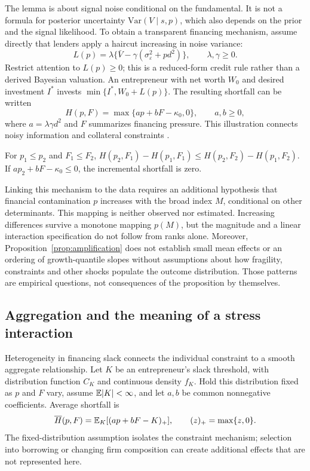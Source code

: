 The lemma is about signal noise conditional on the fundamental. It is not a
formula for posterior uncertainty $\mathrm{Var}(V\mid s,p)$, which also
depends on the prior and the signal likelihood. To obtain a transparent
financing mechanism, assume directly that lenders apply a haircut increasing
in noise variance:
\begin{equation}\label{eq:credit}
 L(p)=\lambda\{\bar V-\gamma(\sigma_\varepsilon^2+pd^2)\},
 \qquad \lambda,\gamma\ge0.
\end{equation}
Restrict attention to $L(p)\ge0$; this is a reduced-form credit rule rather
than a derived Bayesian valuation. An entrepreneur with net worth $W_0$ and
desired investment $I^*$ invests $\min\{I^*,W_0+L(p)\}$. The resulting
shortfall can be written
\begin{equation}\label{eq:harm}
 H(p,F)=\max\{ap+bF-\kappa_0,0\},\qquad a,b\ge0,
\end{equation}
where $a=\lambda\gamma d^2$ and $F$ summarizes financing pressure. This
illustration connects noisy information and collateral constraints
\citep{kiyotaki1997credit,bernanke1999financial,bond2012real}.

\begin{proposition}\label{prop:amplification}
For $p_1\le p_2$ and $F_1\le F_2$,
$H(p_2,F_1)-H(p_1,F_1)\le H(p_2,F_2)-H(p_1,F_2)$.
If $ap_2+bF-\kappa_0\le0$, the incremental shortfall is zero.
\end{proposition}

Linking this mechanism to the data requires an additional hypothesis that
financial contamination $p$ increases with the broad index $M$, conditional
on other determinants. This mapping is neither observed nor estimated.
Increasing differences survive a monotone mapping $p(M)$, but the magnitude
and a linear interaction specification do not follow from ranks alone.
Moreover, Proposition~\ref{prop:amplification} does not establish small mean
effects or an ordering of growth-quantile slopes without assumptions about
how fragility, constraints and other shocks populate the outcome distribution.
Those patterns are empirical questions, not consequences of the proposition
by themselves.

\subsection{Aggregation and the meaning of a stress interaction}\label{subsec:aggregation}
Heterogeneity in financing slack connects the individual constraint to a
smooth aggregate relationship. Let $K$ be an entrepreneur's slack threshold,
with distribution function $C_K$ and continuous density $f_K$. Hold this
distribution fixed as $p$ and $F$ vary, assume $\mathbb{E}|K|<\infty$, and let $a,b$
be common nonnegative coefficients. Average shortfall is
\begin{equation}\label{eq:aggregate-harm}
 \overline H(p,F)=\mathbb{E}_K[(ap+bF-K)_+],\qquad (z)_+=\max\{z,0\}.
\end{equation}
The fixed-distribution assumption isolates the constraint mechanism;
selection into borrowing or changing firm composition can create additional
effects that are not represented here.

